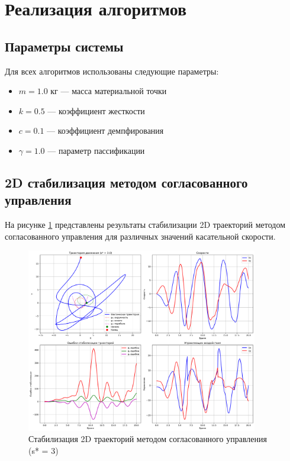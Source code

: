 \section{Реализация алгоритмов}

\subsection{Параметры системы}

Для всех алгоритмов использованы следующие параметры:
\begin{itemize}
\item $m = 1.0$ кг --- масса материальной точки
\item $k = 0.5$ --- коэффициент жесткости
\item $c = 0.1$ --- коэффициент демпфирования
\item $\gamma = 1.0$ --- параметр пассификации
\end{itemize}

\subsection{2D стабилизация методом согласованного управления}

На рисунке \ref{fig:coordinated_2d} представлены результаты стабилизации 2D траекторий методом согласованного управления для различных значений касательной скорости.

\begin{figure}[H]
\centering
\includegraphics[width=0.9\textwidth]{images/task1/coordinated_control_2d_s3.0.png}
\caption{Стабилизация 2D траекторий методом согласованного управления (s* = 3)}
\label{fig:coordinated_2d}
\end{figure}

